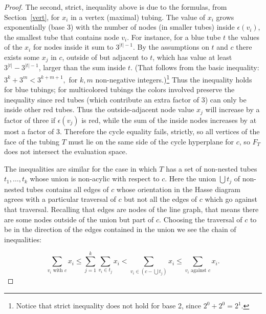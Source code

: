 \documentclass{article}
\newcommand{\precdot}{\prec\mathrel{\mkern-5mu}\mathrel{\cdot}}
\begin{document}
\begin{proof}
The second, strict, inequality above is  due to the formulas, from Section~\ref{vert}, for $x_i$ in a vertex (maximal) tubing. The value of $x_i$ grows exponentially (base 3) with the number of nodes (in smaller tubes) inside $\epsilon(v_i)$,  the smallest tube that contains node $v_i$.   For instance,  for a blue tube $t$ the values of the $x_i$ for nodes inside it sum to $3^{|t|-1}.$ By the assumptions on $t$ and $c$ there exists some $x_j$ in $c$, outside of but adjacent to $t$, which has value at least $3^{|t|}-3^{|t|-1}$, larger than the sum inside $t.$ (That follows from the basic inequality: $ 3^k+3^m < 3^{k+m+1},$ for $k,m$ non-negative integers.)\footnote{Notice that strict inequality does not hold for base 2, since $2^0 +2^0  = 2^1.$} Thus the inequality holds for blue tubings; for multicolored tubings the colors involved preserve the inequality since red tubes (which contribute an extra factor of 3) can only be inside other red tubes. Thus the outside-adjacent node value $x_j$ will increase by a factor of three if $\epsilon(v_j)$ is red, while the sum of the inside nodes increases by at most a factor of 3. 
Therefore the cycle equality fails, strictly, so  all vertices of the face of the tubing $T$ must lie on the same side of the cycle hyperplane for $c$, so  $F_T$ does not intersect the evaluation space.

The inequalities are similar for the case in which $T$ has a set of non-nested tubes $t_1,\dots,t_k$ whose union is non-acylic with respect to $c$.  Here the union $\bigcup t_j$ of non-nested tubes contains all edges of $c$ whose orientation in the Hasse diagram agrees with a particular traversal of $c$ but not all the edges of $c$ which go against that traversal. Recalling that edges are nodes of the line graph, that means there are some nodes outside of the union but part of $c$. Choosing the traversal of $c$ to be in the direction of the edges contained in the union we see the chain of inequalities:  


$$\sum_{v_i\text{ with }c} x_i 
\le \sum_{j=1}^k\sum_{v_i \in t_j} x_i 
< \sum_{v_i\in (c - \bigcup t_j)} x_i
\le \sum_{v_i\text{ against }c} x_i .$$


\end{proof}
\end{document}
